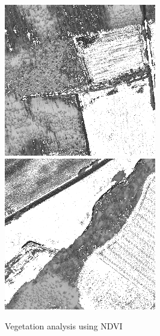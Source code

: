\begin{figure}
    \includegraphics[width=\VegetationIndicesImageWidth]{images/vegetation/ndvi/4} \hfill
    \includegraphics[width=\VegetationIndicesImageWidth]{images/vegetation/ndvi/5}

    \caption{Vegetation analysis using NDVI}
    \label{fig:vegetation_ndvi_examples}
\end{figure}


